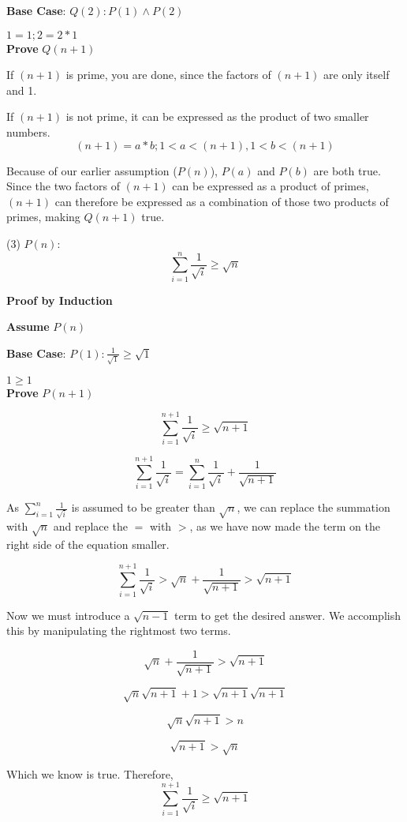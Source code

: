 \documentclass[]{article}
\def\AND{\wedge}
\begin{document}
\textbf{Base Case}: $Q(2): P(1) \AND P(2)$

$1 = 1; 2 = 2*1$ \\

\textbf{Prove} $Q(n+1)$

If $(n+1)$ is prime, you are done, since the factors of $(n+1)$ are only itself and 1.

If $(n+1)$ is not prime, it can be expressed as the product of two smaller numbers. 
$$(n+1) = a*b; 1< a < (n+1), 1 < b < (n+1)$$

Because of our earlier assumption ($P(n)$), $P(a)$ and $P(b)$ are both true. Since the two factors of $(n+1)$ can be expressed as a product of primes, $(n+1)$ can therefore be expressed as a combination of those two products of primes, making $Q(n+1)$ true.

\newpage

\noindent (3) $P(n)$: $$\sum_{i = 1}^{n}\frac{1}{\sqrt{i}} \geq \sqrt{n}$$

\textbf{Proof by Induction}

\textbf{Assume} $P(n)$

\textbf{Base Case}: $P(1): \frac{1}{\sqrt{1}} \geq \sqrt{1}$

$1 \geq 1$ \\

\textbf{Prove} $P(n+1)$

$$\sum_{i = 1}^{n+1}\frac{1}{\sqrt{i}} \geq \sqrt{n+1}$$

$$\sum_{i = 1}^{n+1}\frac{1}{\sqrt{i}} = \sum_{i = 1}^{n}\frac{1}{\sqrt{i}} + \frac{1}{\sqrt{n+1}}$$

As $\sum_{i = 1}^{n}\frac{1}{\sqrt{i}}$ is assumed to be greater than $\sqrt{n}$, we can replace the summation with $\sqrt{n}$ and replace the $=$ with $>$, as we have now made the term on the right side of the equation smaller.

$$\sum_{i = 1}^{n+1}\frac{1}{\sqrt{i}} > \sqrt{n} + \frac{1}{\sqrt{n+1}} > \sqrt{n+1}$$

Now we must introduce a $\sqrt{n-1}$ term to get the desired answer. We accomplish this by manipulating the rightmost two terms.

$$\sqrt{n} + \frac{1}{\sqrt{n+1}} > \sqrt{n+1}$$

$$\sqrt{n} \sqrt{n+1}+1 > \sqrt{n+1} \sqrt{n+1}$$

$$\sqrt{n} \sqrt{n+1} > n$$

$$\sqrt{n+1} > \sqrt{n}$$

Which we know is true. Therefore,
$$ \sum_{i = 1}^{n+1}\frac{1}{\sqrt{i}} \geq \sqrt{n+1}$$
\end{document}

